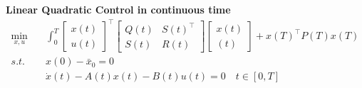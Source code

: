 \begin{tcolorbox}[colback=yellow!5!white,colframe=yellow!75!black,title=\textbf{Dynamic Programming}]
\textbf{Linear Quadratic Control in continuous time}
\begin{align*}
	\min_{x,u}\quad&
	\int_{0}^{T}
	\begin{bmatrix}
		x(t)\\ u(t)
	\end{bmatrix}^\top
	\begin{bmatrix}
		Q(t) & S(t)^\top\\ S(t) & R(t)
	\end{bmatrix}
	\begin{bmatrix}
		x(t)\\ (t)
	\end{bmatrix}
	+
	x(T)^\top P(T) x(T)\\
	s.t.\quad&
	x(0) - \bar{x}_0 = 0\\
	&\dot{x}(t) - A(t) x(t) - B(t) u(t) = 0 \quad  t \in [0, T]
\end{align*}

\end{tcolorbox}